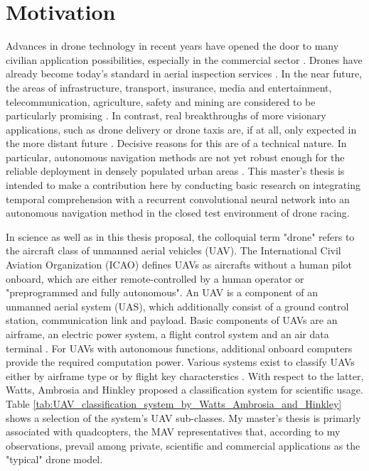 \chapter{Motivation}

Advances in drone technology in recent years
have opened the door to many civilian application possibilities,
especially in the commercial sector \cite{MunichRE}.
Drones have already become today's standard in 
aerial inspection services
\cite{McKinsey, Equinox, Percepto}.
In the near future, the areas of
infrastructure,
transport,
insurance,
media and entertainment,
telecommunication,
agriculture,
safety
and mining 
are considered to be particularly promising \cite{PwC2016}.
In contrast, 
real breakthroughs of more visionary applications, 
such as drone delivery or drone taxis
are, if at all, only expected in the more distant future \cite{Rosen2019}.
Decisive reasons for this are of a technical nature. 
In particular, autonomous navigation methods are not yet 
robust enough for the reliable deployment in densely populated urban areas \cite{loquercio2018learning}.
This master's thesis is intended to make a contribution here
by conducting basic research on integrating temporal comprehension with a recurrent convolutional neural network into
an autonomous navigation method in the closed test environment of drone racing.


In science as well as in this thesis proposal, the colloquial term "drone" refers
to the aircraft class of unmanned aerial vehicles (UAV).
The International Civil Aviation Organization (ICAO) \cite{ICAO2005} defines UAVs
as aircrafts without a human pilot onboard, 
which are either remote-controlled by a human operator or "preprogrammed and fully autonomous".
An UAV is a component of an unmanned aerial system (UAS), which additionally consist of a ground control station, communication link and payload. 
Basic components of UAVs are an airframe, an electric power system, a flight
control system and an air data terminal \cite{Fahlstrom2012}.
For UAVs with autonomous functions, additional onboard computers
provide the required computation power.
Various systems exist to classify UAVs either by 
airframe type \cite{Austin2011} or by flight key characterstics \cite{USDOD2011, Wei2016}.
With respect to the latter, 
Watts, Ambrosia and Hinkley \cite{Watts2012} proposed a classification system 
for scientific usage.
Table \ref{tab:UAV_classification_system_by_Watts_Ambrosia_and_Hinkley} shows a selection of the system's UAV sub-classes.
My master's thesis is primarly associated with quadcopters,
the MAV representatives that, according to my observations,
prevail among private, scientific and commercial applications as the "typical" drone model.


